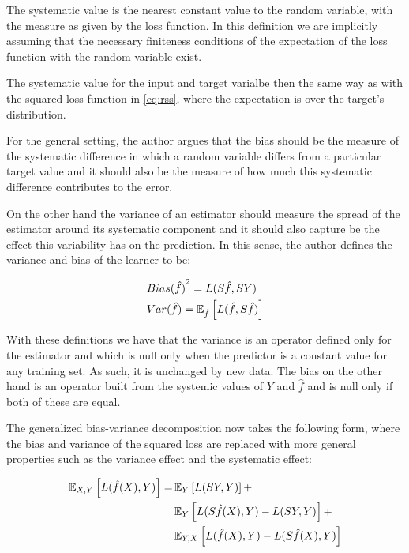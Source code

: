 The systematic value is the nearest constant value to the random variable, with the measure as given by the loss function.
In this definition we are implicitly assuming that the necessary finiteness conditions of the expectation of the loss function with the random variable exist.

The systematic value for the input and target varialbe then the same way as with the squared loss function in \cref{eq:rss}, where the expectation is over the target's distribution.

For the general setting, the author argues that the bias should be the measure of the systematic difference in which a random variable differs from a particular target value and it should also be the measure of how much this systematic difference contributes to the error.

On the other hand the variance of an estimator should measure the spread of the estimator around its systematic component and it should also capture be the effect this variability has on the prediction.
In this sense, the author defines the variance and bias of the learner to be:

\begin{equation}
\begin{split}
& {Bias(\hat{f})}^2 = L(S\hat{f},SY) \\
& Var(\hat{f}) = \operatorname{\mathbb{E}}_{\hat{f}} \left[ L(\hat{f} , S\hat{f}) \right]
\end{split}
\end{equation}

With these definitions we have that the variance is an operator defined only for the estimator and which is null only when the predictor is a constant value for any training set.
As such, it is unchanged by new data.
The bias on the other hand is an operator built from the systemic values of $Y$ and $\hat{f}$ and is null only if both of these are equal.

The generalized bias-variance decomposition now takes the following form, where the bias and variance of the squared loss are replaced with more general properties such as the variance effect and the systematic effect:

\begin{equation}
\begin{split}
\operatorname{\mathbb{E}}_{X,Y} \left[ L(\hat{f}(X),Y )\right] = & \operatorname{\mathbb{E}}_{Y} \left[ L(SY,Y )\right] + \\
 & \operatorname{\mathbb{E}}_{Y} \left[ L(S\hat{f}(X),Y ) - L(SY,Y )\right] + \\
 & \operatorname{\mathbb{E}}_{Y,X} \left[ L(\hat{f}(X),Y ) - L(S\hat{f}(X),Y )\right]
\end{split}
\end{equation}

